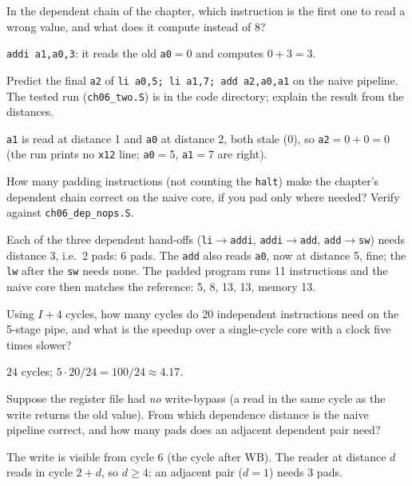 \begin{exercise}[easy]\label{ex:e06d}
In the dependent chain of the chapter, which instruction is the
first one to read a wrong value, and what does it compute instead of
8?
\end{exercise}
\begin{solution}[hint]
\texttt{addi a1,a0,3}: it reads the old \texttt{a0}$=0$ and computes
$0+3=3$.
\end{solution}

\begin{exercise}[medium]\label{ex:m06f}
Predict the final \texttt{a2} of \texttt{li a0,5; li a1,7; add a2,a0,a1}
on the naive pipeline. The tested run (\texttt{ch06\_two.S}) is in the
code directory; explain the result from the distances.
\end{exercise}
\begin{solution}[hint]
\texttt{a1} is read at distance 1 and \texttt{a0} at distance 2, both
stale ($0$), so \texttt{a2}$=0+0=0$ (the run prints no \texttt{x12}
line; \texttt{a0}$=5$, \texttt{a1}$=7$ are right).
\end{solution}

\begin{exercise}[medium]\label{ex:m06g}
How many padding instructions (not counting the \texttt{halt}) make the
chapter's dependent chain correct on the naive core, if you pad only
where needed? Verify against \texttt{ch06\_dep\_nops.S}.
\end{exercise}
\begin{solution}[hint]
Each of the three dependent hand-offs (\texttt{li}$\to$\texttt{addi},
\texttt{addi}$\to$\texttt{add}, \texttt{add}$\to$\texttt{sw}) needs
distance 3, i.e.\ 2 pads: 6 pads. The \texttt{add} also reads
\texttt{a0}, now at distance 5, fine; the \texttt{lw} after the
\texttt{sw} needs none. The padded program runs 11 instructions and
the naive core then matches the reference: 5, 8, 13, 13, memory 13.
\end{solution}

\begin{exercise}[medium]\label{ex:m06h}
Using $I+4$ cycles, how many cycles do 20 independent instructions
need on the 5-stage pipe, and what is the speedup over a single-cycle
core with a clock five times slower?
\end{exercise}
\begin{solution}[hint]
$24$ cycles; $5\cdot20/24=100/24\approx4.17$.
\end{solution}

\begin{exercise}[hard]\label{ex:h06c}
Suppose the register file had \emph{no} write-bypass (a read in the
same cycle as the write returns the old value). From which dependence
distance is the naive pipeline correct, and how many pads does an
adjacent dependent pair need?
\end{exercise}
\begin{solution}[hint]
The write is visible from cycle 6 (the cycle after WB). The reader
at distance $d$ reads in cycle $2+d$, so $d\ge4$: an adjacent pair
($d=1$) needs 3 pads.
\end{solution}

